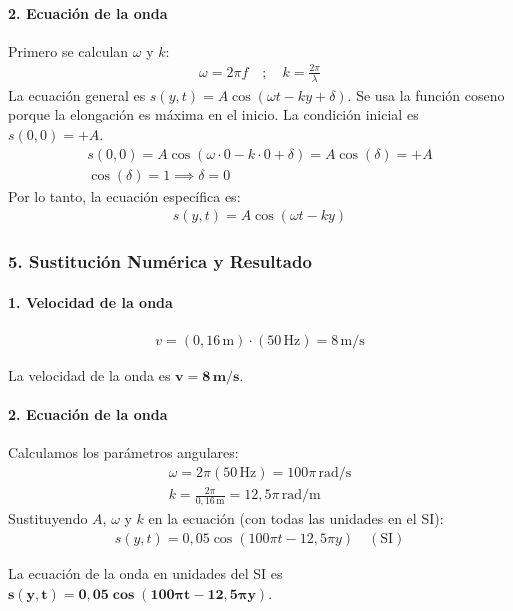\paragraph{2. Ecuación de la onda}
Primero se calculan $\omega$ y $k$:
\begin{gather}
    \omega = 2\pi f \quad ; \quad k = \frac{2\pi}{\lambda}
\end{gather}
La ecuación general es $s(y,t) = A\cos(\omega t - ky + \delta)$. Se usa la función coseno porque la elongación es máxima en el inicio.
La condición inicial es $s(0,0)=+A$.
\begin{gather}
    s(0,0) = A\cos(\omega \cdot 0 - k \cdot 0 + \delta) = A\cos(\delta) = +A \nonumber \\
    \cos(\delta) = 1 \implies \delta = 0
\end{gather}
Por lo tanto, la ecuación específica es:
\begin{gather}
    s(y,t) = A\cos(\omega t - ky)
\end{gather}

\subsubsection*{5. Sustitución Numérica y Resultado}
\paragraph{1. Velocidad de la onda}
\begin{gather}
    v = (0,16 \, \text{m}) \cdot (50 \, \text{Hz}) = 8 \, \text{m/s}
\end{gather}
\begin{cajaresultado}
    La velocidad de la onda es $\boldsymbol{v = 8 \, \textbf{m/s}}$.
\end{cajaresultado}

\paragraph{2. Ecuación de la onda}
Calculamos los parámetros angulares:
\begin{gather}
    \omega = 2\pi (50 \, \text{Hz}) = 100\pi \, \text{rad/s} \\
    k = \frac{2\pi}{0,16 \, \text{m}} = 12,5\pi \, \text{rad/m}
\end{gather}
Sustituyendo $A$, $\omega$ y $k$ en la ecuación (con todas las unidades en el SI):
\begin{gather}
    s(y,t) = 0,05 \cos(100\pi t - 12,5\pi y) \quad (\text{SI})
\end{gather}
\begin{cajaresultado}
    La ecuación de la onda en unidades del SI es $\boldsymbol{s(y,t) = 0,05 \cos(100\pi t - 12,5\pi y)}$.
\end{cajaresultado}

